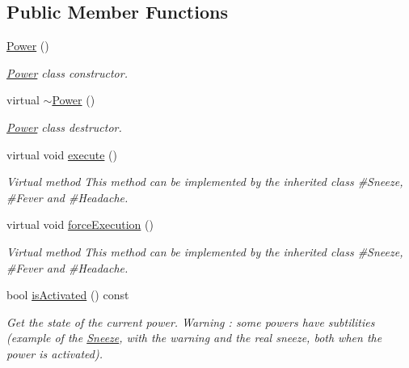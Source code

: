 \subsection*{Public Member Functions}
\begin{DoxyCompactItemize}
\item 
\hyperlink{class_symp_1_1_power_a5848fe6b14bb7df471bd4b09a0a1f51d}{Power} ()
\begin{DoxyCompactList}\small\item\em \hyperlink{class_symp_1_1_power}{Power} class constructor. \end{DoxyCompactList}\item 
virtual \hyperlink{class_symp_1_1_power_ae20f1c2cba6616ed2903a8f082a0098f}{$\sim$\-Power} ()
\begin{DoxyCompactList}\small\item\em \hyperlink{class_symp_1_1_power}{Power} class destructor. \end{DoxyCompactList}\item 
virtual void \hyperlink{class_symp_1_1_power_a148a017c9f01bea343d062460074eae5}{execute} ()
\begin{DoxyCompactList}\small\item\em Virtual method This method can be implemented by the inherited class \#\-Sneeze, \#\-Fever and \#\-Headache. \end{DoxyCompactList}\item 
virtual void \hyperlink{class_symp_1_1_power_acc825d941b947be435944fc4d876a118}{force\-Execution} ()
\begin{DoxyCompactList}\small\item\em Virtual method This method can be implemented by the inherited class \#\-Sneeze, \#\-Fever and \#\-Headache. \end{DoxyCompactList}\item 
bool \hyperlink{class_symp_1_1_power_af57b06001854e1fe33589af20be33ce0}{is\-Activated} () const 
\begin{DoxyCompactList}\small\item\em Get the state of the current power. Warning \-: some powers have subtilities (example of the \hyperlink{class_symp_1_1_sneeze}{Sneeze}, with the warning and the real sneeze, both when the power is activated). \end{DoxyCompactList}\end{DoxyCompactItemize}
